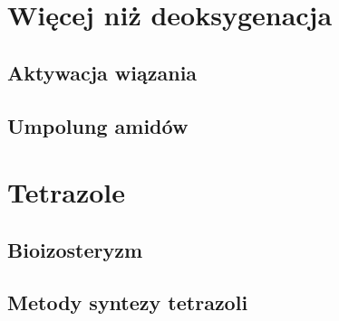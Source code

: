 \section{Więcej niż deoksygenacja}\label{literature:other}
\subsection{Aktywacja wiązania }\label{literature:other:c-n}
\subsection{Umpolung amidów}\label{literature:other:umpolung}

\section{Tetrazole}\label{literature:tetrazole}
\subsection{Bioizosteryzm}\label{literature:tetrazole:bioisosterizm}
\subsection{Metody syntezy tetrazoli}\label{literature:tetrazole:synthesis}
